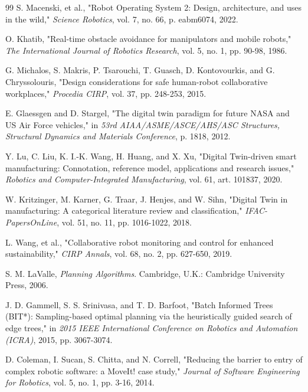 \begin{thebibliography}{99}
 S. Macenski, et al., "Robot Operating System 2: Design, architecture, and uses in the wild," \textit{Science Robotics}, vol. 7, no. 66, p. eabm6074, 2022.

 O. Khatib, "Real-time obstacle avoidance for manipulators and mobile robots," \textit{The International Journal of Robotics Research}, vol. 5, no. 1, pp. 90-98, 1986.

 G. Michalos, S. Makris, P. Tsarouchi, T. Guasch, D. Kontovourkis, and G. Chryssolouris, "Design considerations for safe human-robot collaborative workplaces," \textit{Procedia CIRP}, vol. 37, pp. 248-253, 2015.

 E. Glaessgen and D. Stargel, "The digital twin paradigm for future NASA and US Air Force vehicles," in \textit{53rd AIAA/ASME/ASCE/AHS/ASC Structures, Structural Dynamics and Materials Conference}, p. 1818, 2012.

 Y. Lu, C. Liu, K. I.-K. Wang, H. Huang, and X. Xu, "Digital Twin-driven smart manufacturing: Connotation, reference model, applications and research issues," \textit{Robotics and Computer-Integrated Manufacturing}, vol. 61, art. 101837, 2020.

 W. Kritzinger, M. Karner, G. Traar, J. Henjes, and W. Sihn, "Digital Twin in manufacturing: A categorical literature review and classification," \textit{IFAC-PapersOnLine}, vol. 51, no. 11, pp. 1016-1022, 2018.

 L. Wang, et al., "Collaborative robot monitoring and control for enhanced sustainability," \textit{CIRP Annals}, vol. 68, no. 2, pp. 627-650, 2019.

 S. M. LaValle, \textit{Planning Algorithms}. Cambridge, U.K.: Cambridge University Press, 2006.

 J. D. Gammell, S. S. Srinivasa, and T. D. Barfoot, "Batch Informed Trees (BIT*): Sampling-based optimal planning via the heuristically guided search of edge trees," in \textit{2015 IEEE International Conference on Robotics and Automation (ICRA)}, 2015, pp. 3067-3074.

 D. Coleman, I. Sucan, S. Chitta, and N. Correll, "Reducing the barrier to entry of complex robotic software: a MoveIt! case study," \textit{Journal of Software Engineering for Robotics}, vol. 5, no. 1, pp. 3-16, 2014.


\end{thebibliography}

